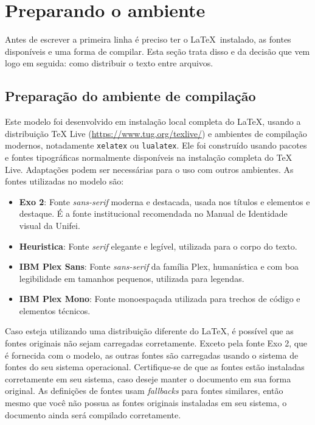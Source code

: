 \chapter{Preparando o ambiente}\label{cap:ambiente}

Antes de escrever a primeira linha é preciso ter o \LaTeX\ instalado, as fontes disponíveis e uma
forma de compilar. Esta seção trata disso e da decisão que vem logo em seguida: como distribuir o
texto entre arquivos.

\section{Preparação do ambiente de compilação}\label{sec:preparacao-ambiente}

Este modelo foi desenvolvido em instalação local completa do \LaTeX, usando a distribuição TeX Live
(\url{https://www.tug.org/texlive/}) e ambientes de compilação modernos, notadamente
\texttt{xelatex} ou \texttt{lualatex}. Ele foi construído usando pacotes e fontes tipográficas
normalmente disponíveis na instalação completa do TeX Live. Adaptações podem ser necessárias para o
uso com outros ambientes. As fontes utilizadas no modelo são:
\begin{itemize}
      \item \textbf{Exo 2}: Fonte \emph{sans-serif} moderna e destacada, usada nos títulos e elementos e destaque. É a fonte institucional recomendada no Manual de Identidade visual da Unifei.
      \item \textbf{Heuristica}: Fonte \emph{serif} elegante e legível, utilizada para o corpo do texto.
      \item \textbf{IBM Plex Sans}: Fonte \emph{sans-serif} da família Plex, humanística e com boa legibilidade em tamanhos pequenos, utilizada para legendas.
      \item \textbf{IBM Plex Mono}: Fonte monoespaçada utilizada para trechos de código e elementos técnicos.
\end{itemize}

Caso esteja utilizando uma distribuição diferente do \LaTeX, é possível que as fontes originais não
sejam carregadas corretamente. Exceto pela fonte Exo 2, que é fornecida com o modelo, as outras
fontes são carregadas usando o sistema de fontes do seu sistema operacional. Certifique-se de que as
fontes estão instaladas corretamente em seu sistema, caso deseje manter o documento em sua forma
original. As definições de fontes usam \emph{fallbacks} para fontes similares, então mesmo que você
não possua as fontes originais instaladas em seu sistema, o documento ainda será compilado corretamente.

